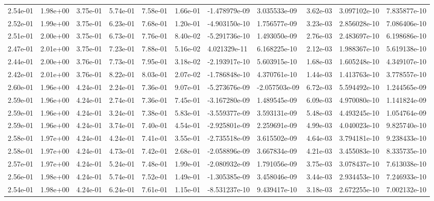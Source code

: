 \begin{longtable}{| p{} | p{} |}
2.54e-01 & 1.98e+00 & 3.75e-01 & 5.74e-01 & 7.58e-01 & 1.66e-01 & -1.478979e-09 &  3.035533e-09 &  3.62e-03 &  3.097102e-10 &  7.835877e-10 \\
2.52e-01 & 1.99e+00 & 3.75e-01 & 6.23e-01 & 7.68e-01 & 1.20e-01 & -4.903150e-10 &  1.756577e-09 &  3.23e-03 &  2.856028e-10 &  7.086406e-10 \\
2.51e-01 & 2.00e+00 & 3.75e-01 & 6.73e-01 & 7.76e-01 & 8.40e-02 & -5.291736e-10 &  1.493050e-09 &  2.76e-03 &  2.483697e-10 &  6.198686e-10 \\
2.47e-01 & 2.01e+00 & 3.75e-01 & 7.23e-01 & 7.88e-01 & 5.16e-02 &  4.021329e-11 &  6.168225e-10 &  2.12e-03 &  1.988367e-10 &  5.619138e-10 \\
2.44e-01 & 2.00e+00 & 3.76e-01 & 7.73e-01 & 7.95e-01 & 3.18e-02 & -2.193917e-10 &  5.603915e-10 &  1.68e-03 &  1.605248e-10 &  4.349107e-10 \\
2.42e-01 & 2.01e+00 & 3.76e-01 & 8.22e-01 & 8.03e-01 & 2.07e-02 & -1.786848e-10 &  4.370761e-10 &  1.44e-03 &  1.413763e-10 &  3.778557e-10 \\
2.60e-01 & 1.96e+00 & 4.24e-01 & 2.24e-01 & 7.36e-01 & 9.07e-01 & -5.273676e-09 & -2.057503e-09 &  6.72e-03 &  5.594492e-10 &  1.244565e-09 \\
2.59e-01 & 1.96e+00 & 4.24e-01 & 2.74e-01 & 7.36e-01 & 7.45e-01 & -3.167280e-09 &  1.489545e-09 &  6.09e-03 &  4.970080e-10 &  1.141824e-09 \\
2.59e-01 & 1.96e+00 & 4.24e-01 & 3.24e-01 & 7.38e-01 & 5.83e-01 & -3.559377e-09 &  3.593131e-09 &  5.48e-03 &  4.493245e-10 &  1.054764e-09 \\
2.59e-01 & 1.96e+00 & 4.24e-01 & 3.74e-01 & 7.40e-01 & 4.54e-01 & -2.925801e-09 &  2.259691e-09 &  4.99e-03 &  4.040023e-10 &  9.825740e-10 \\
2.58e-01 & 1.97e+00 & 4.24e-01 & 4.24e-01 & 7.41e-01 & 3.55e-01 & -2.735518e-09 &  3.615502e-09 &  4.64e-03 &  3.794181e-10 &  9.238433e-10 \\
2.58e-01 & 1.97e+00 & 4.24e-01 & 4.73e-01 & 7.42e-01 & 2.68e-01 & -2.058896e-09 &  3.667834e-09 &  4.21e-03 &  3.455083e-10 &  8.335735e-10 \\
2.57e-01 & 1.97e+00 & 4.24e-01 & 5.24e-01 & 7.48e-01 & 1.99e-01 & -2.080932e-09 &  1.791056e-09 &  3.75e-03 &  3.078437e-10 &  7.613038e-10 \\
2.56e-01 & 1.98e+00 & 4.24e-01 & 5.74e-01 & 7.52e-01 & 1.49e-01 & -1.305385e-09 &  3.458046e-09 &  3.44e-03 &  2.934453e-10 &  7.246933e-10 \\
2.54e-01 & 1.98e+00 & 4.24e-01 & 6.24e-01 & 7.61e-01 & 1.15e-01 & -8.531237e-10 &  9.439417e-10 &  3.18e-03 &  2.672255e-10 &  7.002132e-10 \\

\end{longtable}
